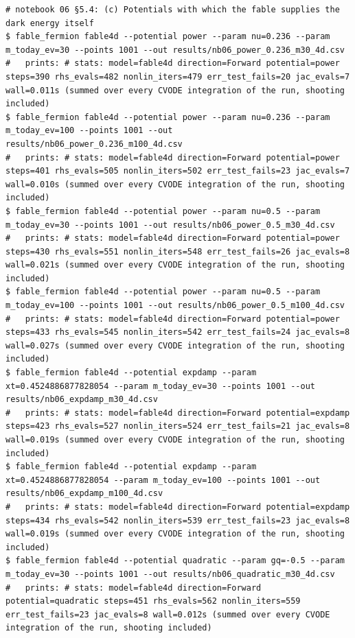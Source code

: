 \begin{Verbatim}
# notebook 06 §5.4: (c) Potentials with which the fable supplies the dark energy itself
$ fable_fermion fable4d --potential power --param nu=0.236 --param m_today_ev=30 --points 1001 --out results/nb06_power_0.236_m30_4d.csv
#   prints: # stats: model=fable4d direction=Forward potential=power steps=390 rhs_evals=482 nonlin_iters=479 err_test_fails=20 jac_evals=7 wall=0.011s (summed over every CVODE integration of the run, shooting included)
$ fable_fermion fable4d --potential power --param nu=0.236 --param m_today_ev=100 --points 1001 --out results/nb06_power_0.236_m100_4d.csv
#   prints: # stats: model=fable4d direction=Forward potential=power steps=401 rhs_evals=505 nonlin_iters=502 err_test_fails=23 jac_evals=7 wall=0.010s (summed over every CVODE integration of the run, shooting included)
$ fable_fermion fable4d --potential power --param nu=0.5 --param m_today_ev=30 --points 1001 --out results/nb06_power_0.5_m30_4d.csv
#   prints: # stats: model=fable4d direction=Forward potential=power steps=430 rhs_evals=551 nonlin_iters=548 err_test_fails=26 jac_evals=8 wall=0.021s (summed over every CVODE integration of the run, shooting included)
$ fable_fermion fable4d --potential power --param nu=0.5 --param m_today_ev=100 --points 1001 --out results/nb06_power_0.5_m100_4d.csv
#   prints: # stats: model=fable4d direction=Forward potential=power steps=433 rhs_evals=545 nonlin_iters=542 err_test_fails=24 jac_evals=8 wall=0.027s (summed over every CVODE integration of the run, shooting included)
$ fable_fermion fable4d --potential expdamp --param xt=0.4524886877828054 --param m_today_ev=30 --points 1001 --out results/nb06_expdamp_m30_4d.csv
#   prints: # stats: model=fable4d direction=Forward potential=expdamp steps=423 rhs_evals=527 nonlin_iters=524 err_test_fails=21 jac_evals=8 wall=0.019s (summed over every CVODE integration of the run, shooting included)
$ fable_fermion fable4d --potential expdamp --param xt=0.4524886877828054 --param m_today_ev=100 --points 1001 --out results/nb06_expdamp_m100_4d.csv
#   prints: # stats: model=fable4d direction=Forward potential=expdamp steps=434 rhs_evals=542 nonlin_iters=539 err_test_fails=23 jac_evals=8 wall=0.019s (summed over every CVODE integration of the run, shooting included)
$ fable_fermion fable4d --potential quadratic --param gq=-0.5 --param m_today_ev=30 --points 1001 --out results/nb06_quadratic_m30_4d.csv
#   prints: # stats: model=fable4d direction=Forward potential=quadratic steps=451 rhs_evals=562 nonlin_iters=559 err_test_fails=23 jac_evals=8 wall=0.012s (summed over every CVODE integration of the run, shooting included)

\end{Verbatim}
